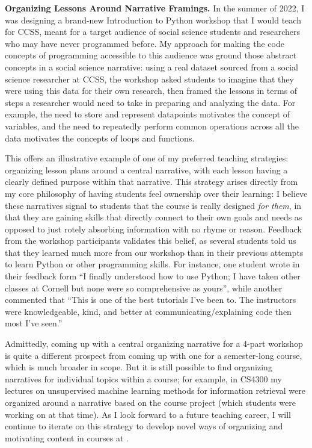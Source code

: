 \documentclass[11pt,letterpaper]{article}
\renewcommand{\section}[1]{\vspace{0.25\baselineskip}\noindent\textbf{#1.}}
\begin{document}
\section{Organizing Lessons Around Narrative Framings}
In the summer of 2022, I was designing a brand-new Introduction to Python workshop that I would teach for CCSS, meant for a target audience of social science students and researchers who may have never programmed before.
My approach for making the code concepts of programming accessible to this audience was ground those abstract concepts in a social science narrative: using a real dataset sourced from a social science researcher at CCSS, the workshop asked students to imagine that they were using this data for their own research, then framed the lessons in terms of steps a researcher would need to take in preparing and analyzing the data.
For example, the need to store and represent datapoints motivates the concept of variables, and the need to repeatedly perform common operations across all the data motivates the concepts of loops and functions.

This offers an illustrative example of one of my preferred teaching strategies: organizing lesson plans around a central narrative, with each lesson having a clearly defined purpose within that narrative.
This strategy arises directly from my core philosophy of having students feel ownership over their learning: I believe these narratives signal to students that the course is really designed \emph{for them}, in that they are gaining skills that directly connect to their own goals and needs as opposed to just rotely absorbing information with no rhyme or reason.
Feedback from the workshop participants validates this belief, as several students told us that they learned much more from our workshop than in their previous attempts to learn Python or other programming skills.
For instance, one student wrote in their feedback form ``I finally understood how to use Python; I have taken other classes at Cornell but none were so comprehensive as yours'', while another commented that ``This is one of the best tutorials I've been to. The instructors were knowledgeable, kind, and better at communicating/explaining code then most I've seen.''

Admittedly, coming up with a central organizing narrative for a 4-part workshop is quite a different prospect from coming up with one for a semester-long course, which is much broader in scope.
But it is still possible to find organizing narratives for individual topics within a course; for example, in CS4300 my lectures on unsupervised machine learning methods for information retrieval were organized around a narrative based on the course project (which students were working on at that time).
As I look forward to a future teaching career, I will continue to iterate on this strategy to develop novel ways of organizing and motivating content in courses at \schoolname.
\end{document}
